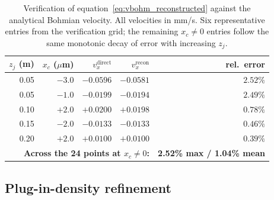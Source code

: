 \documentclass[11pt,a4paper]{article}
\begin{document}
\begin{table}[ht]
\centering
\small
\caption{Verification of equation~\eqref{eq:vbohm_reconstructed} against the analytical Bohmian velocity. All velocities in mm/s. Six representative entries from the verification grid; the remaining $x_c \neq 0$ entries follow the same monotonic decay of error with increasing $z_j$.}
\label{tab:formula_verification}
\begin{tabular}{rrrrr}
\toprule
$z_j$ (m) & $x_c$ ($\mu$m) & $v_x^\text{direct}$ & $v_x^\text{recon}$ & rel.\ error \\
\midrule
0.05 & $-3.0$  & $-0.0596$ & $-0.0581$ & $2.52\%$ \\
0.05 & $-1.0$  & $-0.0199$ & $-0.0194$ & $2.49\%$ \\
0.10 & $+2.0$  & $+0.0200$ & $+0.0198$ & $0.78\%$ \\
0.15 & $-2.0$  & $-0.0133$ & $-0.0133$ & $0.46\%$ \\
0.20 & $+2.0$  & $+0.0100$ & $+0.0100$ & $0.39\%$ \\
\midrule
\multicolumn{4}{r}{\textbf{Across the 24 points at $x_c \neq 0$:}} & \textbf{2.52\% max / 1.04\% mean} \\
\bottomrule
\end{tabular}
\end{table}

\subsection{Plug-in-density refinement}
\label{sec:plug_in}
\end{document}
